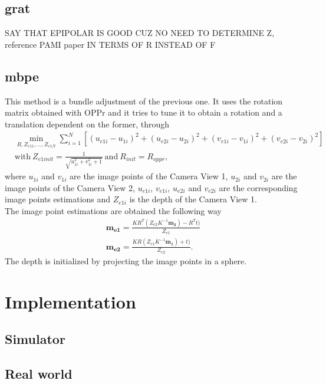 \subsection{\acrlong{grat}}

SAY THAT EPIPOLAR IS GOOD CUZ NO NEED TO DETERMINE Z, reference PAMI paper
IN TERMS OF R INSTEAD OF F
\subsection{\acrlong{mbpe}}
\label{MBaPE}
This method is a bundle adjustment of the previous one. It uses the rotation matrix obtained with OPPr and it tries to tune it to obtain a rotation and a translation dependent on the former, through 
\begin{align*}
	& \min_{R, Z_{e11}, ..., Z_{e1N}} \sum^N_{i=1} [(u_{e1i}-u_{1i})^2 + (u_{e2i}-u_{2i})^2 + (v_{e1i}-v_{1i})^2 + (v_{e2i}-v_{2i})^2]\\
	& \text{with} \ Z_{e1init} = \frac{1}{\sqrt{u_{1i}^2 + v_{1i}^2 + 1}} \ \text{and} \ R_{init} = R_{oppr},
\end{align*}
where $u_{1i}$ and $v_{1i}$ are the image points of the Camera View 1, $u_{2i}$ and $v_{2i}$ are the image points of the Camera View 2, $u_{e1i}$, $v_{e1i}$, $u_{e2i}$ and $v_{e2i}$ are the corresponding image points estimations and $Z_{e1i}$ is the depth of the Camera View 1.\\
The image point estimations are obtained the following way
\begin{align*}
	\mathbf{m_{e1}} = \frac{KR^T(Z_{e2}K^{-1}\mathbf{m_2}) - R^Tt)}{Z_{e1}}\\
	\mathbf{m_{e2}} = \frac{KR(Z_{e1}K^{-1}\mathbf{m_1}) + t)}{Z_{e2}}.
\end{align*} The depth is initialized by projecting the image points in a sphere.

\section{Implementation}

\subsection{Simulator}

\subsection{Real world}
